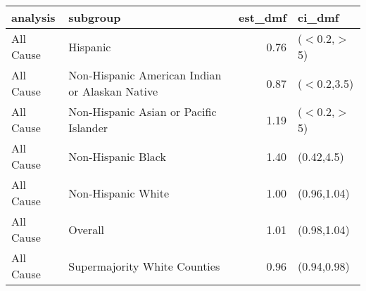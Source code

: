 \begin{table}[ht]
\centering
\begingroup\footnotesize
\begin{tabular}{llrl}
  \hline
analysis & subgroup & est\_dmf & ci\_dmf \\ 
  \hline
All Cause & Hispanic & 0.76 & ($<$0.2,$>$5) \\ 
  All Cause & Non-Hispanic American Indian or Alaskan Native & 0.87 & ($<$0.2,3.5) \\ 
  All Cause & Non-Hispanic Asian or Pacific Islander & 1.19 & ($<$0.2,$>$5) \\ 
  All Cause & Non-Hispanic Black & 1.40 & (0.42,4.5) \\ 
  All Cause & Non-Hispanic White & 1.00 & (0.96,1.04) \\ 
  All Cause & Overall & 1.01 & (0.98,1.04) \\ 
  All Cause & Supermajority White Counties & 0.96 & (0.94,0.98) \\ 
   \hline
\end{tabular}
\endgroup
\caption{} 
\end{table}
